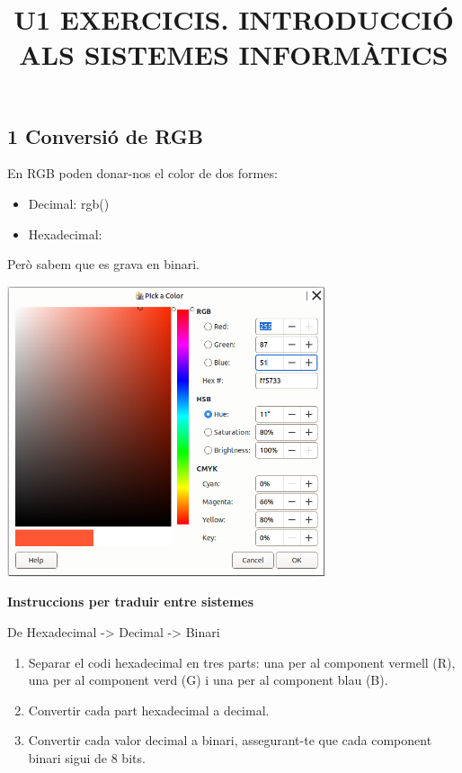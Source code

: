 \documentclass[
  12 pt,
  a4paper,
]{article}
\title{U1 EXERCICIS. INTRODUCCIÓ ALS SISTEMES INFORMÀTICS}
\author{}
\date{\vspace{-2.5em}}
\providecommand{\tightlist}{%
  \setlength{\itemsep}{0pt}\setlength{\parskip}{0pt}}
\begin{document}
\maketitle

{
\setcounter{tocdepth}{2}
\tableofcontents
}
\newpage
\renewcommand\tablename{Tabla}

\subsection{1 Conversió de RGB}\label{conversiuxf3-de-rgb}

En RGB poden donar-nos el color de dos formes:

\begin{itemize}
\tightlist
\item
  Decimal: rgb()
\item
  Hexadecimal:
\end{itemize}

Però sabem que es grava en binari.

\includegraphics[width=0.7\textwidth,height=\textheight]{png/rgbExercici.png}

\textbf{Instruccions per traduir entre sistemes}

De Hexadecimal -\textgreater{} Decimal -\textgreater{} Binari

\begin{enumerate}
\def\labelenumi{\arabic{enumi}.}
\tightlist
\item
  Separar el codi hexadecimal en tres parts: una per al component
  vermell (R), una per al component verd (G) i una per al component blau
  (B).
\item
  Convertir cada part hexadecimal a decimal.
\item
  Convertir cada valor decimal a binari, assegurant-te que cada
  component binari sigui de 8 bits.
\end{enumerate}
\end{document}
